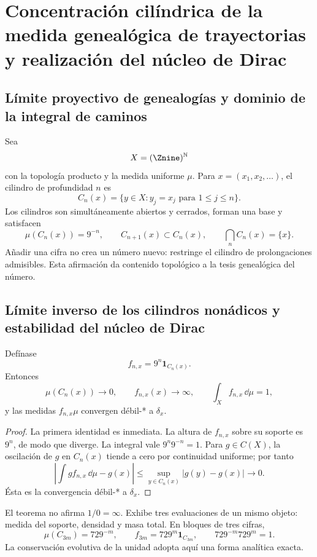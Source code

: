 \chapter{Concentración cilíndrica de la medida genealógica de trayectorias y realización del núcleo de Dirac}

\section{Límite proyectivo de genealogías y dominio de la integral de caminos}

Sea
\[
X=(\Znine)^{\mathbb N}
\]
con la topología producto y la medida uniforme \(\mu\). Para
\(x=(x_1,x_2,\ldots)\), el cilindro de profundidad \(n\) es
\[
C_n(x)=\{y\in X:y_j=x_j\text{ para }1\le j\le n\}.
\]
Los cilindros son simultáneamente abiertos y cerrados, forman una base y
satisfacen
\[
\mu(C_n(x))=9^{-n},\qquad
C_{n+1}(x)\subset C_n(x),\qquad
\bigcap_n C_n(x)=\{x\}.
\]
Añadir una cifra no crea un número nuevo: restringe el cilindro de
prolongaciones admisibles. Esta afirmación da contenido topológico a la tesis
genealógica del número.

\section{Límite inverso de los cilindros nonádicos y estabilidad del núcleo de Dirac}

\begin{theorem}
Defínase
\[
f_{n,x}=9^n\mathbf1_{C_n(x)}.
\]
Entonces
\[
\mu(C_n(x))\to0,\qquad f_{n,x}(x)\to\infty,\qquad
\int_Xf_{n,x}\,\dd\mu=1,
\]
y las medidas \(f_{n,x}\mu\) convergen débil-* a \(\delta_x\).
\end{theorem}

\begin{proof}
La primera identidad es inmediata. La altura de \(f_{n,x}\) sobre su soporte
es \(9^n\), de modo que diverge. La integral vale
\(9^n9^{-n}=1\). Para \(g\in C(X)\), la oscilación de \(g\) en \(C_n(x)\)
tiende a cero por continuidad uniforme; por tanto
\[
\left|\int g f_{n,x}\,\dd\mu-g(x)\right|
\le \sup_{y\in C_n(x)}|g(y)-g(x)|\longrightarrow0.
\]
Ésta es la convergencia débil-* a \(\delta_x\).
\end{proof}

El teorema no afirma \(1/0=\infty\). Exhibe tres evaluaciones de un mismo
objeto: medida del soporte, densidad y masa total. En bloques de tres cifras,
\[
\mu(C_{3m})=729^{-m},\qquad
f_{3m}=729^m\mathbf1_{C_{3m}},\qquad
729^{-m}729^m=1.
\]
La conservación evolutiva de la unidad adopta aquí una forma analítica exacta.

